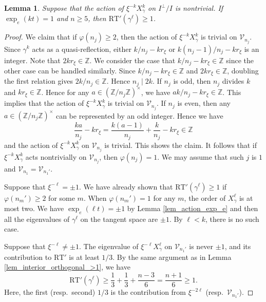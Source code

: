 \documentclass[11pt]{amsart}
\theoremstyle{plain}
\newtheorem{lem}[thm]{Lemma}
\theoremstyle{definition}
\numberwithin{equation}{section}
\def\exp{\mathop{\mathrm{exp}}\nolimits}
\newcommand{\bbZ}{\mathbb{Z}}
\newcommand{\calV}{\mathcal{V}}
\begin{document}
\begin{lem}\label{lem_boundary_orthonal_exp=1}
    Suppose that the action of $\xi^{-k}X_\gamma^k$ on $I^\perp/I$ is nontrivial.
    If $\exp_e(kt) = 1$ and $n \geq 5$, then $\mathrm{RT}'(\gamma^\ell) \geq 1$.
\end{lem}
\begin{proof}
    We claim that if $\varphi(n_j) \geq 2$, then the action of $\xi^{-k}X_\gamma^k$ is trivial on $\calV_{n_j}$.
    Since $\gamma^k$ acts as a quasi-reflection, either $k/n_j - kr_\xi$ or $k(n_j-1)/n_j - k r_\xi$ is an integer.
    Note that $2kr_\xi \in \bbZ$.
    We consider the case that $k/n_j - kr_\xi \in \bbZ$ since the other case can be handled similarly.
Since $k/n_j-kr_\xi\in\bbZ$ and $2kr_\xi\in\bbZ$,
doubling the first relation gives $2k/n_j\in\bbZ$.
Hence $n_j\mid2k$.
    If $n_j$ is odd, then $n_j$ divides $k$ and $kr_\xi \in \bbZ$.
    Hence for any $a \in (\bbZ/n_j\bbZ)^\times$, we have $ak/n_j - kr_\xi \in \bbZ$.
    This implies that the action of $\xi^{-k}X_\gamma^k$ is trivial on $\calV_{n_j}$.
    If $n_j$ is even, then any $a \in (\bbZ/n_j\bbZ)^\times$ can be represented by an odd integer.
    Hence we have
    \[
    \frac{ka}{n_j} - kr_\xi = \frac{k(a-1)}{n_j} + \frac{k}{n_j} - kr_\xi \in \bbZ
    \]
    and the action of $\xi^{-k}X_\gamma^k$ on $\calV_{n_j}$ is trivial.
    This shows the claim.
        It follows that if $\xi^{-k}X_{\gamma}^k$ acts nontrivially on $\calV_{n_j}$, then $\varphi(n_j)=1$.
    We may assume that such $j$ is $1$ and $\calV_{n_1} = \calV_{n_1'}$.

    Suppose that $\xi^{-\ell} = \pm 1$.
        We have already shown that $\mathrm{RT}'(\gamma^\ell)\geq1$ if $\varphi(n_m')\geq2$ for some $m$.
    When $\varphi(n_m') = 1$ for any $m$, the order of $X_\gamma^\ell$ is at most two.
    We have $\exp_e(\ell t) = \pm 1$ by Lemma \ref{lem_action_exp_e} and then all the eigenvalues of $\gamma^\ell$ on the tangent space are $\pm 1$.
    By $\ell < k$, there is no such case.

    Suppose that $\xi^{-\ell} \neq \pm 1$.
        The eigenvalue of $\xi^{-\ell}X_\gamma^\ell$ on $\calV_{n_1'}$ is never $\pm1$, and its contribution to $\mathrm{RT}'$ is at least $1/3$.
    By the same argument as in Lemma \ref{lem_interior_orthogonal_>1}, we have
    \[
    \mathrm{RT}'(\gamma^\ell) \geq \frac13 + \frac13 + \frac{n-3}{6} = \frac{n+1}{6} \geq 1.
    \]
    Here, the first (resp.\ second) $1/3$ is the contribution from $\xi^{-2\ell}$ (resp.\ $\calV_{n_1'}$).
\end{proof}
\end{document}
